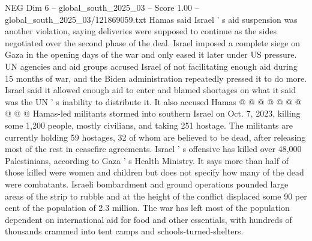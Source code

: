 \begin{textsample}{NEG Dim 6 – global\_south\_2025\_03 – Score 1.00 – global\_south\_2025\_03/121869059.txt}
Hamas said Israel ' s aid suspension was another violation, saying deliveries were supposed to continue as the sides negotiated over the second phase of the deal.
Israel imposed a complete siege on Gaza in the opening days of the war and only eased it later under US pressure.
UN agencies and aid groups accused Israel of not facilitating enough aid during 15 months of war, and the Biden administration repeatedly pressed it to do more.
Israel said it allowed enough aid to enter and blamed shortages on what it said was the UN ' s inability to distribute it.
It also accused Hamas @ @ @ @ @ @ @ @ @ @ Hamas-led militants stormed into southern Israel on Oct. 7, 2023, killing some 1,200 people, mostly civilians, and taking 251 hostage.
The militants are currently holding 59 hostages, 32 of whom are believed to be dead, after releasing most of the rest in ceasefire agreements.
Israel ' s offensive has killed over 48,000 Palestinians, according to Gaza ' s Health Ministry.
It says more than half of those killed were women and children but does not specify how many of the dead were combatants.
Israeli bombardment and ground operations pounded large areas of the strip to rubble and at the height of the conflict displaced some 90 per cent of the population of 2.3 million.
The war has left most of the population dependent on international aid for food and other essentials, with hundreds of thousands crammed into tent camps and schools-turned-shelters.

\end{textsample}
